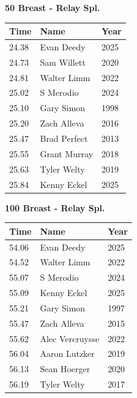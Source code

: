 \vspace{1.2em}
\noindent\begin{minipage}[t]{0.48\textwidth}
\centering
\textbf{\textcolor{teamprimary}{50 Breast - Relay Spl.}}\par
\vspace{0.5em}
\centering
\small
\renewcommand{\arraystretch}{1.0}
\setlength{\tabcolsep}{4pt}
\begin{tabular}{@{}p{1.8cm}p{3.0cm}p{1.0cm}@{}}
\toprule
\textbf{Time} & \textbf{Name} & \textbf{Year} \\
\midrule
24.38 & Evan Deedy & 2025 \\
24.73 & Sam Willett & 2020 \\
24.81 & Walter Limm & 2022 \\
25.02 & S Merodio & 2024 \\
25.10 & Gary Simon & 1998 \\
25.20 & Zach Alleva & 2016 \\
25.47 & Brad Perfect & 2013 \\
25.55 & Grant Murray & 2018 \\
25.63 & Tyler Welty & 2019 \\
25.84 & Kenny Eckel & 2025 \\
\bottomrule
\end{tabular}
\end{minipage}
\hfill
\begin{minipage}[t]{0.48\textwidth}
\centering
\textbf{\textcolor{teamprimary}{100 Breast - Relay Spl.}}\par
\vspace{0.5em}
\centering
\small
\renewcommand{\arraystretch}{1.0}
\setlength{\tabcolsep}{4pt}
\begin{tabular}{@{}p{1.8cm}p{3.0cm}p{1.0cm}@{}}
\toprule
\textbf{Time} & \textbf{Name} & \textbf{Year} \\
\midrule
54.06 & Evan Deedy & 2025 \\
54.52 & Walter Limm & 2022 \\
55.07 & S Merodio & 2024 \\
55.09 & Kenny Eckel & 2025 \\
55.21 & Gary Simon & 1997 \\
55.47 & Zach Alleva & 2015 \\
55.62 & Alec Vercruysse & 2022 \\
56.04 & Aaron Lutzker & 2019 \\
56.13 & Sean Hoerger & 2020 \\
56.19 & Tyler Welty & 2017 \\
\bottomrule
\end{tabular}
\end{minipage}
